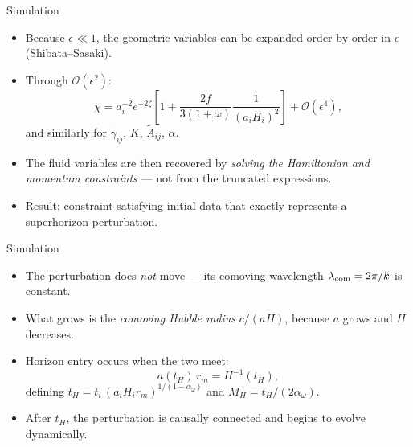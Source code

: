 \documentclass[aspectratio=169, 12pt]{beamer}
\begin{document}
\begin{frame}{Simulation}
	\vspace{0.5em}
	\begin{itemize}
		\item Because $\epsilon \ll 1$, the geometric variables can be
		      expanded order-by-order in $\epsilon$ (Shibata--Sasaki).
		\item Through $\mathcal{O}(\epsilon^2)$:
		      \[
		          \chi = a_i^{-2} e^{-2\zeta}\left[1
		          + \frac{2f}{3(1+\omega)}\frac{1}{(a_i H_i)^2}\right]
		          + \mathcal{O}(\epsilon^4),
		      \]
		      and similarly for
		      $\tilde{\gamma}_{ij}$, $K$, $\tilde{A}_{ij}$, $\alpha$.
		\item The fluid variables are then recovered by
		      \emph{solving the Hamiltonian and momentum
		      constraints} — not from the truncated expressions.
		\item Result: constraint-satisfying initial data that
		      exactly represents a superhorizon perturbation.
	\end{itemize}
\end{frame}
\begin{frame}{Simulation}
	\vspace{0.5em}
	\begin{itemize}
		\item The perturbation does \emph{not} move — its comoving
		      wavelength $\lambda_{\rm com} = 2\pi/k$ is constant.
		\item What grows is the \emph{comoving Hubble radius}
		      $c/(aH)$, because $a$ grows and $H$ decreases.
		\item Horizon entry occurs when the two meet:
		      \[
		          a(t_H)\, r_m = H^{-1}(t_H),
		      \]
		      defining
		      $t_H = t_i\,(a_i H_i r_m)^{1/(1-\alpha_\omega)}$
		      and $M_H = t_H/(2\alpha_\omega)$.
		\item After $t_H$, the perturbation is causally connected
		      and begins to evolve dynamically.
	\end{itemize}
\end{frame}
\end{document}
